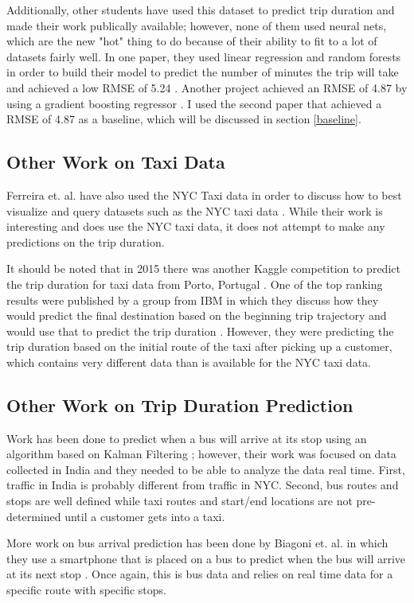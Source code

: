 \documentclass[conference]{IEEEtran}
\begin{document}
Additionally, other students have used this dataset to predict trip duration and made their work publically available; however, none of them used neural nets, which are the new "hot" thing to do because of their ability to fit to a lot of datasets fairly well.  In one paper, they used linear regression and random forests in order to build their model to predict the number of minutes the trip will take and achieved a low RMSE of 5.24 \cite{stanford}.  Another project achieved an RMSE of 4.87 by using a gradient boosting regressor \cite{ucsd}.  I used the second paper that achieved a RMSE of 4.87 as a baseline, which will be discussed in section \ref{baseline}. 

\subsection{Other Work on Taxi Data}
Ferreira et. al. have also used the NYC Taxi data in order to discuss how to best visualize and query datasets such as the NYC taxi data \cite{query}.  While their work is interesting and does use the NYC taxi data, it does not attempt to make any predictions on the trip duration.

It should be noted that in 2015 there was another Kaggle competition to predict the trip duration for taxi data from Porto, Portugal \cite{kagglep}.  One of the top ranking results were published by a group from IBM in which they discuss how they would predict the final destination based on the beginning trip trajectory and would use that to predict the trip duration \cite{ibm}.  However, they were predicting the trip duration based on the initial route of the taxi after picking up a customer, which contains very different data than is available for the NYC taxi data.

\subsection{Other Work on Trip Duration Prediction}
Work has been done to predict when a bus will arrive at its stop using an algorithm based on Kalman Filtering  \cite{india}; however, their work was focused on data collected in India and they needed to be able to analyze the data real time.  First, traffic in India is probably different from traffic in NYC.  Second, bus routes and stops are well defined while taxi routes and start/end locations are not pre-determined until a customer gets into a taxi. 

More work on bus arrival prediction has been done by Biagoni et. al. in which they use a smartphone that is placed on a bus to predict when the bus will arrive at its next stop \cite{et}.  Once again, this is bus data and relies on real time data for a specific route with specific stops.
\end{document}
